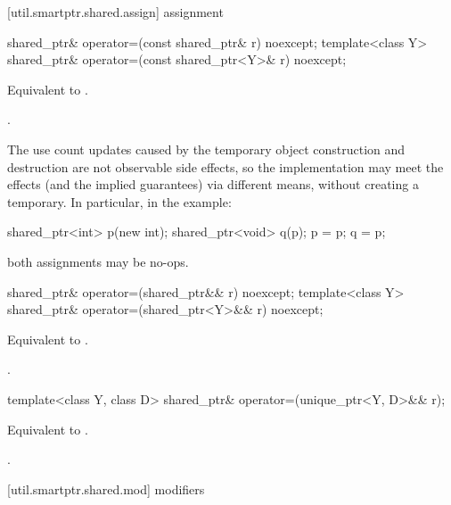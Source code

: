[util.smartptr.shared.assign]{ assignment}

%
\begin{itemdecl}
shared_ptr& operator=(const shared_ptr& r) noexcept;
template<class Y> shared_ptr& operator=(const shared_ptr<Y>& r) noexcept;
\end{itemdecl}

\begin{itemdescr}
\pnum\effects  Equivalent to .

\pnum\returns  {}.

\pnum \begin{note}
The use count updates caused by the temporary object
construction and destruction are not observable side
effects, so the implementation may meet the effects (and the
implied guarantees) via different means, without creating a
temporary. In particular, in the example:
\begin{codeblock}
shared_ptr<int> p(new int);
shared_ptr<void> q(p);
p = p;
q = p;
\end{codeblock}
both assignments may be no-ops. \end{note}
\end{itemdescr}

%
\begin{itemdecl}
shared_ptr& operator=(shared_ptr&& r) noexcept;
template<class Y> shared_ptr& operator=(shared_ptr<Y>&& r) noexcept;
\end{itemdecl}

\begin{itemdescr}
\pnum
\effects Equivalent to .

\pnum
\returns {}.
\end{itemdescr}

%
\begin{itemdecl}
template<class Y, class D> shared_ptr& operator=(unique_ptr<Y, D>&& r);
\end{itemdecl}

\begin{itemdescr}
\pnum
\effects Equivalent to .

\pnum
\returns {}.
\end{itemdescr}

[util.smartptr.shared.mod]{ modifiers}

